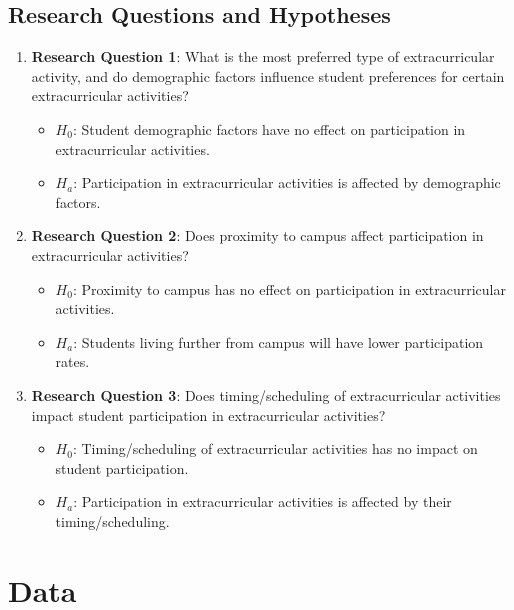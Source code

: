 \documentclass[
  letterpaper,
  DIV=11,
  numbers=noendperiod]{scrartcl}
\providecommand{\tightlist}{%
  \setlength{\itemsep}{0pt}\setlength{\parskip}{0pt}}\usepackage{longtable,booktabs,array}
\begin{document}
\subsection{Research Questions and
Hypotheses}\label{research-questions-and-hypotheses}

\begin{enumerate}
\def\labelenumi{\arabic{enumi}.}
\tightlist
\item
  \textbf{Research Question 1}: What is the most preferred type of
  extracurricular activity, and do demographic factors influence student
  preferences for certain extracurricular activities?

  \begin{itemize}
  \tightlist
  \item
    \(H_{0}\): Student demographic factors have no effect on
    participation in extracurricular activities.
  \item
    \(H_{a}\): Participation in extracurricular activities is affected
    by demographic factors.
  \end{itemize}
\item
  \textbf{Research Question 2}: Does proximity to campus affect
  participation in extracurricular activities?

  \begin{itemize}
  \tightlist
  \item
    \(H_{0}\): Proximity to campus has no effect on participation in
    extracurricular activities.
  \item
    \(H_{a}\): Students living further from campus will have lower
    participation rates.
  \end{itemize}
\item
  \textbf{Research Question 3}: Does timing/scheduling of
  extracurricular activities impact student participation in
  extracurricular activities?

  \begin{itemize}
  \tightlist
  \item
    \(H_{0}\): Timing/scheduling of extracurricular activities has no
    impact on student participation.
  \item
    \(H_{a}\): Participation in extracurricular activities is affected
    by their timing/scheduling.
  \end{itemize}
\end{enumerate}

\section{Data}\label{sec-data}
\end{document}
